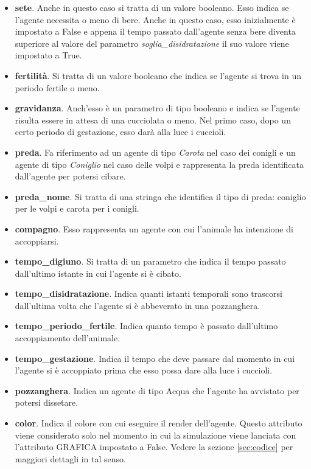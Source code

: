 \documentclass[11pt]{article}
\begin{document}
\begin{itemize}
    \item \textbf{sete}. Anche in questo caso si tratta di un valore booleano. Esso indica se l'agente necessita o meno di bere. Anche in questo caso, esso inizialmente è impostato a False e appena il tempo passato dall'agente senza bere diventa superiore al valore del parametro \emph{soglia\_disidratazione} il suo valore viene impostato a True. 
    \item \textbf{fertilità}. Si tratta di un valore booleano che indica se l'agente si trova in un periodo fertile o meno. 
    \item \textbf{gravidanza}. Anch'esso è un parametro di tipo booleano e indica se l'agente risulta essere in attesa di una cucciolata o meno. Nel primo caso, dopo un certo periodo di gestazione, esso darà alla luce i cuccioli. 
    \item \textbf{preda}. Fa riferimento ad un agente di tipo \emph{Carota} nel caso dei conigli e un agente di tipo \emph{Coniglio} nel caso delle volpi e rappresenta la preda identificata dall'agente per potersi cibare. 
    \item \textbf{preda\_nome}. Si tratta di una stringa che identifica il tipo di preda: coniglio per le volpi e carota per i conigli. 
    \item \textbf{compagno}. Esso rappresenta un agente con cui l'animale ha intenzione di accoppiarsi. 
    \item \textbf{tempo\_digiuno}. Si tratta di un parametro che indica il tempo passato dall'ultimo istante in cui l'agente si è cibato.
    \item \textbf{tempo\_disidratazione}. Indica quanti istanti temporali sono trascorsi dall'ultima volta che l'agente si è abbeverato in una pozzanghera. 
    \item \textbf{tempo\_periodo\_fertile}. Indica quanto tempo è passato dall'ultimo accoppiamento dell'animale. 
    \item \textbf{tempo\_gestazione}. Indica il tempo che deve passare dal momento in cui l'agente si è accoppiato prima che esso possa dare alla luce i cuccioli. 
    \item \textbf{pozzanghera}. Indica un agente di tipo Acqua che l'agente ha avvistato per potersi dissetare.
    \item \textbf{color}. Indica il colore con cui eseguire il render dell'agente. Questo attributo viene considerato solo nel momento in cui la simulazione viene lanciata con l'attributo GRAFICA impostato a False. Vedere la sezione \ref{sec:codice} per maggiori dettagli in tal senso. 

\end{itemize}
\end{document}
